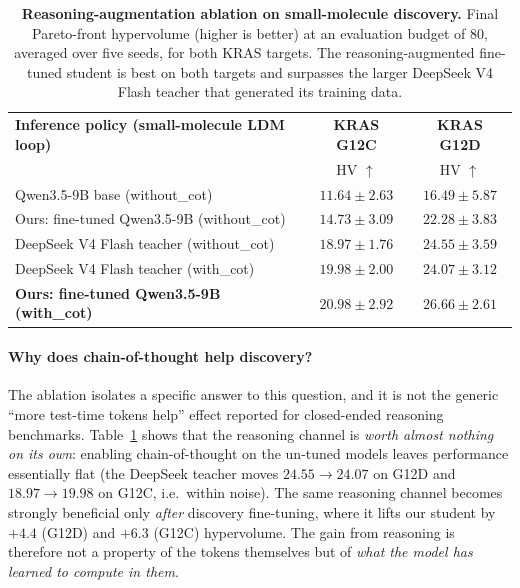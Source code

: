 \begin{table}[t]
\centering
\small
\begin{tabular}{@{}lcc@{}}
\toprule
\textbf{Inference policy (small-molecule LDM loop)} & \textbf{KRAS G12C} & \textbf{KRAS G12D} \\
 & HV $\uparrow$ & HV $\uparrow$ \\
\midrule
Qwen3.5-9B base (without\_cot)                 & $11.64\pm2.63$ & $16.49\pm5.87$ \\
Ours: fine-tuned Qwen3.5-9B (without\_cot)     & $14.73\pm3.09$ & $22.28\pm3.83$ \\
DeepSeek V4 Flash teacher (without\_cot)       & $18.97\pm1.76$ & $24.55\pm3.59$ \\
DeepSeek V4 Flash teacher (with\_cot)          & $19.98\pm2.00$ & $24.07\pm3.12$ \\
\textbf{Ours: fine-tuned Qwen3.5-9B (with\_cot)} & $\mathbf{20.98\pm2.92}$ & $\mathbf{26.66\pm2.61}$ \\
\bottomrule
\end{tabular}
\vspace{0.4em}
\caption{\textbf{Reasoning-augmentation ablation on small-molecule discovery.} Final Pareto-front hypervolume
(higher is better) at an evaluation budget of 80, averaged over five seeds, for both KRAS targets. The
reasoning-augmented fine-tuned student is best on both targets and surpasses the larger DeepSeek V4 Flash
teacher that generated its training data.}
\label{tab:smallmol-cot}
\end{table}

\paragraph{Why does chain-of-thought help discovery?}
The ablation isolates a specific answer to this question, and it is not the generic ``more test-time tokens
help'' effect reported for closed-ended reasoning benchmarks. Table~\ref{tab:smallmol-cot} shows that the
reasoning channel is \emph{worth almost nothing on its own}: enabling chain-of-thought on the un-tuned models
leaves performance essentially flat (the DeepSeek teacher moves $24.55\!\to\!24.07$ on G12D and
$18.97\!\to\!19.98$ on G12C, i.e.\ within noise). The same reasoning channel becomes strongly beneficial only
\emph{after} discovery fine-tuning, where it lifts our student by $+4.4$ (G12D) and $+6.3$ (G12C) hypervolume.
The gain from reasoning is therefore not a property of the tokens themselves but of \emph{what the model has
learned to compute in them}.

